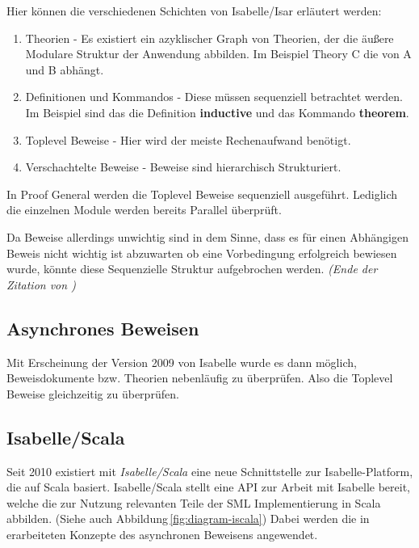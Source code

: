 Hier können die verschiedenen Schichten von Isabelle/Isar erläutert werden:

\begin{enumerate}
  \item Theorien - Es existiert ein azyklischer Graph von Theorien, der die äußere Modulare Struktur
  der Anwendung abbilden. Im Beispiel Theory C die von A und B abhängt. 

  \item Definitionen und Kommandos -   Diese müssen sequenziell betrachtet werden. Im Beispiel sind
  das die Definition   \textbf{inductive} und das Kommando \textbf{theorem}.

  \item Toplevel Beweise - Hier wird der meiste Rechenaufwand benötigt.

  \item Verschachtelte Beweise - Beweise sind hierarchisch Strukturiert. 
\end{enumerate}

In Proof General werden die Toplevel Beweise sequenziell ausgeführt. Lediglich die einzelnen Module
werden bereits Parallel überprüft.

Da Beweise allerdings unwichtig sind in dem Sinne, dass es für einen Abhängigen Beweis nicht wichtig
ist abzuwarten ob eine Vorbedingung erfolgreich bewiesen wurde, könnte diese Sequenzielle Struktur
aufgebrochen werden. \textit{(Ende der Zitation von \cite{parproof})}

\subsection{Asynchrones Beweisen}

Mit Erscheinung der Version 2009 von Isabelle wurde es dann möglich, Beweisdokumente bzw. Theorien
nebenläufig zu überprüfen. Also die Toplevel Beweise gleichzeitig zu überprüfen. \cite{parproof}

\subsection{Isabelle/Scala}

Seit 2010 existiert mit \textit{Isabelle/Scala} eine neue Schnittstelle zur Isabelle-Platform, die
auf Scala basiert. Isabelle/Scala stellt eine API zur Arbeit mit Isabelle bereit, welche die zur
Nutzung relevanten Teile der SML Implementierung in Scala abbilden. \cite{iscala} (Siehe auch
Abbildung\,\ref{fig:diagram-iscala}) Dabei werden die in \cite{parproof} erarbeiteten Konzepte des
asynchronen Beweisens angewendet.


